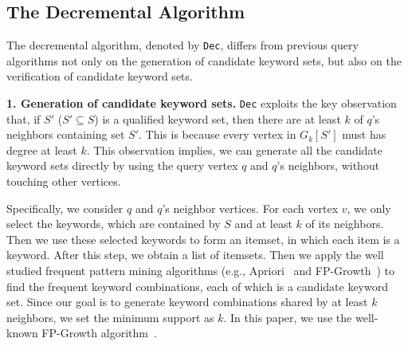 \subsection{The Decremental Algorithm}
\label{dec}

The decremental algorithm, denoted by {\tt Dec}, differs from previous query algorithms
not only on the generation of candidate keyword sets,
but also on the verification of candidate keyword sets.

\textbf{1. Generation of candidate keyword sets.}
{\tt Dec} exploits the key observation that,
if $S'$ ($S'\subseteq S$) is a qualified keyword set,
then there are at least $k$ of $q$'s neighbors containing set $S'$.
This is because every vertex in $G_k[S']$ must has degree at least $k$.
This observation implies,
we can generate all the candidate keyword sets directly by using the query vertex $q$ and $q$'s neighbors,
without touching other vertices.

Specifically, we consider $q$ and $q$'s neighbor vertices.
For each vertex $v$, we only select the keywords, which are contained by $S$ and at least $k$ of its neighbors.
Then we use these selected keywords to form an itemset, in which each item is a keyword.
After this step, we obtain a list of itemsets.
Then we apply the well studied frequent pattern mining algorithms
(e.g., Apriori~\cite{han2011data} and FP-Growth~\cite{han2000mining})
to find the frequent keyword combinations,
each of which is a candidate keyword set.
Since our goal is to generate keyword combinations shared by at least $k$ neighbors,
we set the minimum support as $k$.
In this paper, we use the well-known FP-Growth algorithm~\cite{han2000mining}.

